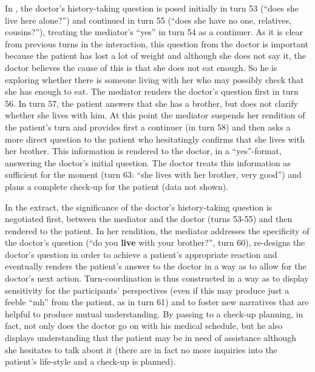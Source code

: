 \documentclass[output=paper]{LSP/langsci}
\begin{document}
In , the doctor's history-taking question is posed initially in turn 53 (``does she live here alone?'') and continued in turn 55 (``does she have no one, relatives, cousins?''), treating the mediator's ``yes'' in turn 54 as a continuer. As it is clear from previous turns in the interaction, this question from the doctor is important because the patient has lost a lot of weight and although she does not say it, the doctor believes the cause of this is that she does not eat enough. So he is exploring whether there is someone living with her who may possibly check that she has enough to eat. The mediator renders the doctor's question first in turn 56. In turn 57, the patient answers that she has a brother, but does not clarify whether she lives with him. At this point the mediator suspends her rendition of the patient's turn and provides first a continuer (in turn 58) and then asks a more direct question to the patient who hesitatingly confirms that she lives with her brother. This information is rendered to the doctor, in a ``yes''-format, answering the doctor's initial question. The doctor treats this information as sufficient for the moment (turn 63: ``she lives with her brother, very good'') and plans a complete check-up for the patient (data not shown).  

In the extract, the significance of the doctor's history-taking question is negotiated first, between the mediator and the doctor (turns 53-55) and then rendered to the patient. In her rendition, the mediator addresses the specificity of the doctor's question (``do you \textbf{live} with your brother?'', turn 60), re-designs the doctor's question in order to achieve a patient's appropriate reaction and eventually renders the patient's answer to the doctor in a way as to allow for the doctor's next action. Turn-coordination is thus constructed in a way as to display sensitivity for the participants' perspectives (even if this may produce just a feeble ``mh'' from the patient, as in turn 61) and to foster new narratives that are helpful to produce mutual understanding. By passing to a check-up planning, in fact, not only does the doctor go on with his medical schedule, but he also displays understanding that the patient may be in need of assistance although she hesitates to talk about it (there are in fact no  more inquiries into the patient's life-style and a check-up is planned).
\end{document}
